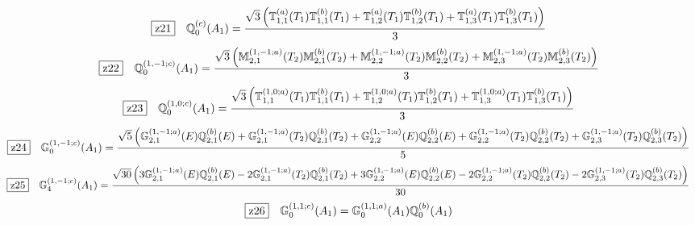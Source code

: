 \documentclass[fleqn,10pt,landscape]{jsarticle}
\begin{document}
\begin{dmath*}
\hspace*{3mm}\fbox{z21}\quad \mathbb{Q}_{0}^{(c)}(A_{1})=\frac{\sqrt{3} \left(\mathbb{T}_{1,1}^{(a)}(T_{1}) \mathbb{T}_{1,1}^{(b)}(T_{1}) + \mathbb{T}_{1,2}^{(a)}(T_{1}) \mathbb{T}_{1,2}^{(b)}(T_{1}) + \mathbb{T}_{1,3}^{(a)}(T_{1}) \mathbb{T}_{1,3}^{(b)}(T_{1})\right)}{3}
\end{dmath*}
\begin{dmath*}
\hspace*{3mm}\fbox{z22}\quad \mathbb{Q}_{0}^{(1,-1;c)}(A_{1})=\frac{\sqrt{3} \left(\mathbb{M}_{2,1}^{(1,-1;a)}(T_{2}) \mathbb{M}_{2,1}^{(b)}(T_{2}) + \mathbb{M}_{2,2}^{(1,-1;a)}(T_{2}) \mathbb{M}_{2,2}^{(b)}(T_{2}) + \mathbb{M}_{2,3}^{(1,-1;a)}(T_{2}) \mathbb{M}_{2,3}^{(b)}(T_{2})\right)}{3}
\end{dmath*}
\begin{dmath*}
\hspace*{3mm}\fbox{z23}\quad \mathbb{Q}_{0}^{(1,0;c)}(A_{1})=\frac{\sqrt{3} \left(\mathbb{T}_{1,1}^{(1,0;a)}(T_{1}) \mathbb{T}_{1,1}^{(b)}(T_{1}) + \mathbb{T}_{1,2}^{(1,0;a)}(T_{1}) \mathbb{T}_{1,2}^{(b)}(T_{1}) + \mathbb{T}_{1,3}^{(1,0;a)}(T_{1}) \mathbb{T}_{1,3}^{(b)}(T_{1})\right)}{3}
\end{dmath*}
\begin{dmath*}
\hspace*{3mm}\fbox{z24}\quad \mathbb{G}_{0}^{(1,-1;c)}(A_{1})=\frac{\sqrt{5} \left(\mathbb{G}_{2,1}^{(1,-1;a)}(E) \mathbb{Q}_{2,1}^{(b)}(E) + \mathbb{G}_{2,1}^{(1,-1;a)}(T_{2}) \mathbb{Q}_{2,1}^{(b)}(T_{2}) + \mathbb{G}_{2,2}^{(1,-1;a)}(E) \mathbb{Q}_{2,2}^{(b)}(E) + \mathbb{G}_{2,2}^{(1,-1;a)}(T_{2}) \mathbb{Q}_{2,2}^{(b)}(T_{2}) + \mathbb{G}_{2,3}^{(1,-1;a)}(T_{2}) \mathbb{Q}_{2,3}^{(b)}(T_{2})\right)}{5}
\end{dmath*}
\begin{dmath*}
\hspace*{3mm}\fbox{z25}\quad \mathbb{G}_{4}^{(1,-1;c)}(A_{1})=\frac{\sqrt{30} \left(3 \mathbb{G}_{2,1}^{(1,-1;a)}(E) \mathbb{Q}_{2,1}^{(b)}(E) - 2 \mathbb{G}_{2,1}^{(1,-1;a)}(T_{2}) \mathbb{Q}_{2,1}^{(b)}(T_{2}) + 3 \mathbb{G}_{2,2}^{(1,-1;a)}(E) \mathbb{Q}_{2,2}^{(b)}(E) - 2 \mathbb{G}_{2,2}^{(1,-1;a)}(T_{2}) \mathbb{Q}_{2,2}^{(b)}(T_{2}) - 2 \mathbb{G}_{2,3}^{(1,-1;a)}(T_{2}) \mathbb{Q}_{2,3}^{(b)}(T_{2})\right)}{30}
\end{dmath*}
\begin{dmath*}
\hspace*{3mm}\fbox{z26}\quad \mathbb{G}_{0}^{(1,1;c)}(A_{1})=\mathbb{G}_{0}^{(1,1;a)}(A_{1}) \mathbb{Q}_{0}^{(b)}(A_{1})
\end{dmath*}
\end{document}
